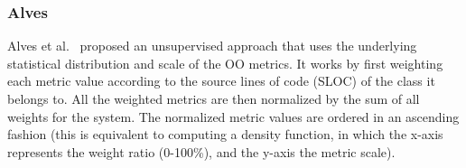 \documentclass[10pt,journal,compsoc]{IEEEtran}
\newcommand{\be}{\begin{enumerate}}
\newcommand{\ee}{\end{enumerate}}
\begin{document}




\subsubsection{Alves}

Alves et al.~\cite{alves} proposed an unsupervised approach
that  uses the underlying statistical 
distribution and scale of the OO metrics. It works by first weighting each metric value according to the source lines of 
code (SLOC) of the class it belongs to. All the weighted metrics are then normalized by the sum of all weights for the system. The normalized metric values are ordered in an ascending fashion (this is 
equivalent to computing a density function, in which the x-axis represents 
the weight ratio (0-100\%), and the y-axis the metric scale).
\end{document}
